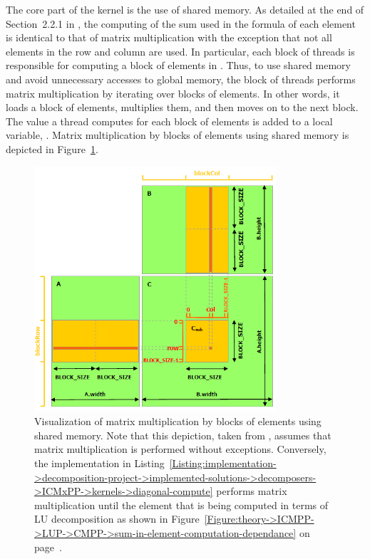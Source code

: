 The core part of the kernel is the use of shared memory. As detailed at the end of Section~2.2.1 in  \cite{Cejka2022}, the computing of the sum used in the formula of each element is identical to that of matrix multiplication with the exception that not all elements in the row and column are used. In particular, each block of threads is responsible for computing a block of elements in . Thus, to use shared memory and avoid unnecessary accesses to global memory, the block of threads performs matrix multiplication by iterating over blocks of elements. In other words, it loads a block of elements, multiplies them, and then moves on to the next block. The value a thread computes for each block of elements is added to a local variable, . Matrix multiplication by blocks of elements using shared memory is depicted in Figure~\ref{Figure:implementation->decomposition-project->implemented-solutions->decomposers->ICMxPP->CUDA-matrix-multiplication-with-shared-memory}.

\begin{figure}[ht!]
	\centering
	\includegraphics[width=0.8\textwidth, keepaspectratio]{images/ch02/CUDA-matrix-multiplication-by-blocks-using-shared-memory.png}
	\caption{Visualization of matrix multiplication by blocks of elements using shared memory. Note that this depiction, taken from  \cite{NVIDIADecember2022}, assumes that matrix multiplication is performed without exceptions. Conversely, the implementation in Listing~\ref{Listing:implementation->decomposition-project->implemented-solutions->decomposers->ICMxPP->kernels->diagonal-compute} performs matrix multiplication until the element that is being computed in terms of LU decomposition as shown in Figure~\ref{Figure:theory->ICMPP->LUP->CMPP->sum-in-element-computation-dependance} on page~\pageref{Figure:theory->ICMPP->LUP->CMPP->sum-in-element-computation-dependance}.}
	\label{Figure:implementation->decomposition-project->implemented-solutions->decomposers->ICMxPP->CUDA-matrix-multiplication-with-shared-memory}
\end{figure}

